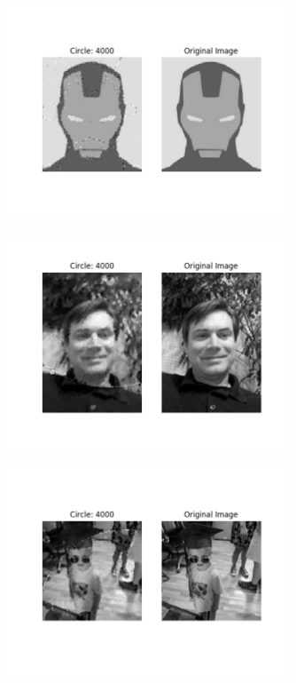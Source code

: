 \documentclass[12pt]{article}
\begin{document}
\begin{figure}[H]
\centering
\noindent\includegraphics[width=0.75\textwidth]{../results/ironman/ironman_4000}
\end{figure}

\begin{figure}[H]
\centering
\noindent\includegraphics[width=0.75\textwidth]{../results/jmcgough/jmcgough_4000}
\end{figure}

\begin{figure}[H]
\centering
\noindent\includegraphics[width=0.75\textwidth]{../results/k/k_4000}
\end{figure}
\end{document}
